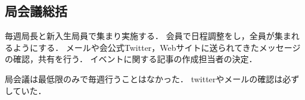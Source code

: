 \subsection*{局会議総括}



毎週局長と新入生局員で集まり実施する．
会員で日程調整をし，全員が集まれるようにする．
メールや会公式Twitter，Webサイトに送られてきたメッセージの確認，共有を行う．
イベントに関する記事の作成担当者の決定．

局会議は最低限のみで毎週行うことはなかった．
twitterやメールの確認は必ずしていた．